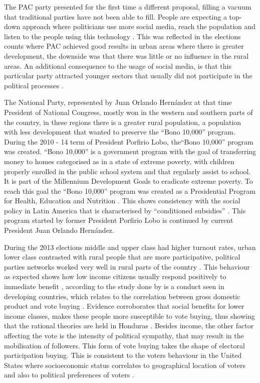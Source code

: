 \documentclass[letterpaper,10pt]{article}
\begin{document}
The PAC party presented for the first time a different proposal, filling a vacuum that traditional parties have not been able to fill. People are expecting a top-down approach where politicians use more social media, reach the population and listen to the people using this technology \citep{map2014}. This was reflected in the elections counts where PAC achieved good results in urban areas where there is greater development, the downside was that there was little or no influence in the rural areas. An additional consequence to the usage of social media, is that this particular party attracted younger sectors that usually did not participate in the political processes \citep{romero2014}.

The National Party, represented by Juan Orlando Hernández at that time President of National Congress, mostly won in the western and southern parts of the country, in these regions there is a greater rural population, a population with less development that wanted to preserve the ``Bono 10,000'' program. During the 2010 - 14 term of President Porfirio Lobo, the``Bono 10,000'' program was created. ``Bono 10,000'' is a government program with the goal of transferring money to homes categorised as in a state of extreme poverty, with children properly enrolled in the public school system and that regularly assist to school. It is part of the Millennium Development Goals \citep{mdg2006} to eradicate extreme poverty. To reach this goal the ``Bono 10,000'' program was created as a Presidential Program for Health, Education and Nutrition \citep{bono10k}. This shows consistency with the social policy in Latin America that is characterised by ``conditioned subsidies'' \citep{romero2014}. This program started by former President Porfirio Lobo is continued by current President Juan Orlando Hern\'{a}ndez. 

During the 2013 elections middle and upper class had higher turnout rates, urban lower class contrasted with rural people that are more participative, political parties networks worked very well in rural parts of the country \citep{romero2014}. This behaviour as expected shows how low income citizens usually respond positively to immediate benefit \citep{kit2000}, according to the study done by \cite{gonza2014} is a conduct seen in developing countries, which relates to the correlation between gross domestic product and vote buying . Evidence corroborates that social benefits for lower income classes, makes these people more susceptible to vote buying, thus showing that the rational theories are held in Honduras \citep{gonza2014}. Besides income, the other factor affecting the vote is the intensity of political sympathy, that may result in the mobilisation of followers. This form of vote buying takes the shape of electoral participation buying. This is consistent to the voters behaviour in the United States where socioeconomic status correlates to geographical location of voters and also to political preferences of voters \citep{osborn2010}.
\end{document}
